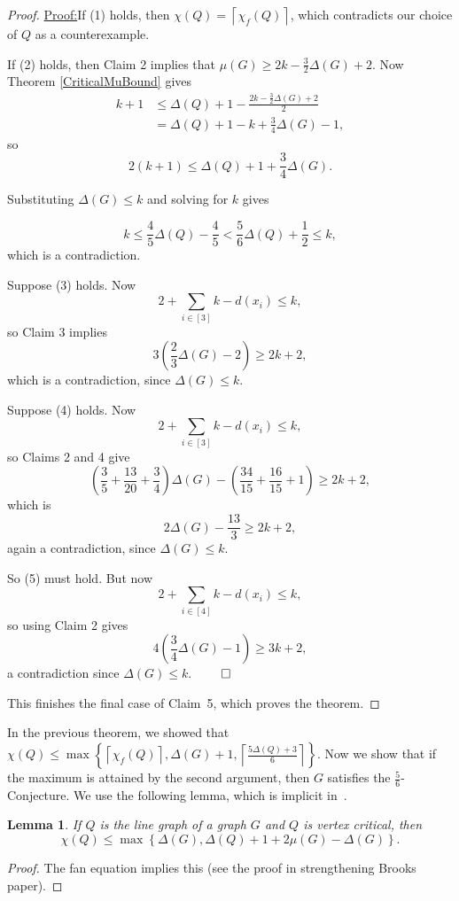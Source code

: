 \documentclass[12pt]{amsart}
\theoremstyle{plain}
\newtheorem{lem}[thm]{Lemma}
\theoremstyle{definition}
\theoremstyle{remark}
\newcommand{\set}[1]{\left\{ #1 \right\}}
\newcommand{\ceil}[1]{\left\lceil#1\right\rceil}
\newcommand{\irange}[1]{\left[#1\right]}
\newcommand{\parens}[1]{\left( #1 \right)}
\newenvironment{claimproof}[1]{\par\noindent\underline{Proof:}\space#1}{\leavevmode\unskip\penalty9999
\hbox{}\nobreak\hfill\quad\hbox{$\qed$}}
\begin{document}
\begin{proof}
\begin{claimproof}
If (1) holds, then $\chi(Q) = \ceil{\chi_f(Q)}$, which contradicts our choice of
$Q$ as a counterexample.

If (2) holds, then Claim 2 implies that $\mu(G) \ge 2k - \frac32\Delta(G) + 2$. 
Now Theorem \ref{CriticalMuBound} gives
\begin{align*}
k + 1 &\le \Delta(Q)+1-\frac{2k-\frac32\Delta(G)+2}2\\
&=\Delta(Q) + 1 - k +
\frac34\Delta(G) - 1,
\end{align*}
so
\[2(k + 1) \le \Delta(Q) + 1 + \frac34\Delta(G).\]

Substituting $\Delta(G) \le k$ and solving for $k$ gives

\[k  \le \frac45\Delta(Q) - \frac45 < \frac56\Delta(Q)+\frac12 \le k,\]
which is a contradiction.

Suppose (3) holds.  
Now \[2 + \sum_{i \in \irange{3}} k - d(x_i) \le k,\]
so Claim 3 implies
\[3\parens{\frac23\Delta(G) -2} \ge 2k+2,\]
which is a contradiction, since $\Delta(G) \le k$.

Suppose (4) holds.  Now
\[2 + \sum_{i \in \irange{3}} k - d(x_i) \le k,\]
so Claims 2 and 4 give
\[ \parens{\frac35 + \frac{13}{20} + \frac34}\Delta(G)-\parens{\frac{34}{15} + \frac{16}{15} + 1}\ge 2k+2,\]
which is
\[2\Delta(G) -\frac{13}3\ge 2k+2,\]
again a contradiction, since $\Delta(G) \le k$.


So (5) must hold.  But now
\[2 + \sum_{i \in \irange{4}} k - d(x_i) \le k,\]
so using Claim 2 gives
\[4\parens{\frac34\Delta(G) - 1} \ge 3k+2,\]
a contradiction since $\Delta(G) \le k$.
\end{claimproof}

This finishes the final case of Claim~5, which proves the theorem.
\end{proof}

In the previous theorem, we showed that 
$\chi(Q) \le \max\set{\ceil{\chi_f(Q)}, \Delta(G) + 1, \ceil{\frac{5\Delta(Q) +
3}{6}}}$.  Now we show that if the maximum is attained by the second argument,
then $G$ satisfies the $\frac56$-Conjecture.
We use the following lemma, which is implicit in~\cite{rabern2011strengthening}.

\begin{lem}\label{CriticalMuBoundOtherWay}
If $Q$ is the line graph of a graph $G$ and $Q$ is vertex critical, then
\[\chi(Q) \leq \max\left\{\Delta(G), \Delta(Q) + 1 + 2\mu(G) - \Delta(G)\right\}.\]
\end{lem}
\begin{proof}
The fan equation implies this (see the proof in strengthening Brooks paper).
\end{proof}
\end{document}
